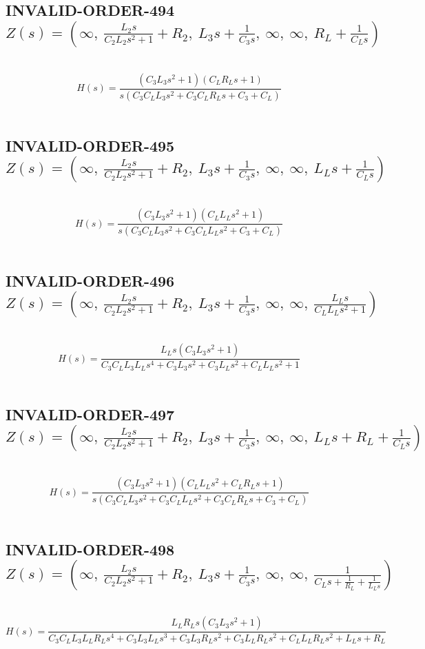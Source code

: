 \documentclass{article}
\begin{document}
\subsection{INVALID-ORDER-494 $Z(s) = \left( \infty, \  \frac{L_{2} s}{C_{2} L_{2} s^{2} + 1} + R_{2}, \  L_{3} s + \frac{1}{C_{3} s}, \  \infty, \  \infty, \  R_{L} + \frac{1}{C_{L} s}\right)$ } \ 
\textbf{\[H(s) = \frac{\left(C_{3} L_{3} s^{2} + 1\right) \left(C_{L} R_{L} s + 1\right)}{s \left(C_{3} C_{L} L_{3} s^{2} + C_{3} C_{L} R_{L} s + C_{3} + C_{L}\right)}\] } \ 
\subsection{INVALID-ORDER-495 $Z(s) = \left( \infty, \  \frac{L_{2} s}{C_{2} L_{2} s^{2} + 1} + R_{2}, \  L_{3} s + \frac{1}{C_{3} s}, \  \infty, \  \infty, \  L_{L} s + \frac{1}{C_{L} s}\right)$ } \ 
\textbf{\[H(s) = \frac{\left(C_{3} L_{3} s^{2} + 1\right) \left(C_{L} L_{L} s^{2} + 1\right)}{s \left(C_{3} C_{L} L_{3} s^{2} + C_{3} C_{L} L_{L} s^{2} + C_{3} + C_{L}\right)}\] } \ 
\subsection{INVALID-ORDER-496 $Z(s) = \left( \infty, \  \frac{L_{2} s}{C_{2} L_{2} s^{2} + 1} + R_{2}, \  L_{3} s + \frac{1}{C_{3} s}, \  \infty, \  \infty, \  \frac{L_{L} s}{C_{L} L_{L} s^{2} + 1}\right)$ } \ 
\textbf{\[H(s) = \frac{L_{L} s \left(C_{3} L_{3} s^{2} + 1\right)}{C_{3} C_{L} L_{3} L_{L} s^{4} + C_{3} L_{3} s^{2} + C_{3} L_{L} s^{2} + C_{L} L_{L} s^{2} + 1}\] } \ 
\subsection{INVALID-ORDER-497 $Z(s) = \left( \infty, \  \frac{L_{2} s}{C_{2} L_{2} s^{2} + 1} + R_{2}, \  L_{3} s + \frac{1}{C_{3} s}, \  \infty, \  \infty, \  L_{L} s + R_{L} + \frac{1}{C_{L} s}\right)$ } \ 
\textbf{\[H(s) = \frac{\left(C_{3} L_{3} s^{2} + 1\right) \left(C_{L} L_{L} s^{2} + C_{L} R_{L} s + 1\right)}{s \left(C_{3} C_{L} L_{3} s^{2} + C_{3} C_{L} L_{L} s^{2} + C_{3} C_{L} R_{L} s + C_{3} + C_{L}\right)}\] } \ 
\subsection{INVALID-ORDER-498 $Z(s) = \left( \infty, \  \frac{L_{2} s}{C_{2} L_{2} s^{2} + 1} + R_{2}, \  L_{3} s + \frac{1}{C_{3} s}, \  \infty, \  \infty, \  \frac{1}{C_{L} s + \frac{1}{R_{L}} + \frac{1}{L_{L} s}}\right)$ } \ 
\textbf{\[H(s) = \frac{L_{L} R_{L} s \left(C_{3} L_{3} s^{2} + 1\right)}{C_{3} C_{L} L_{3} L_{L} R_{L} s^{4} + C_{3} L_{3} L_{L} s^{3} + C_{3} L_{3} R_{L} s^{2} + C_{3} L_{L} R_{L} s^{2} + C_{L} L_{L} R_{L} s^{2} + L_{L} s + R_{L}}\] } \ 
\end{document}
